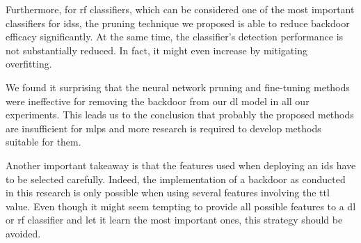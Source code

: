 \documentclass[10pt,sigconf,letterpaper,dvipsnames]{acmart}
\begin{document}
Furthermore, for \gls{rf} classifiers, which can be considered one of the most important classifiers for \glspl{ids}, the pruning technique we proposed is able to reduce backdoor efficacy significantly. At the same time, the classifier's detection performance is not substantially reduced. In fact, it might even increase by mitigating overfitting.

We found it surprising that the neural network pruning and fine-tuning methods were ineffective for removing the backdoor from our \gls{dl} model in all our experiments. This leads us to the conclusion that probably the proposed methods are insufficient for \glspl{mlp} and more research is required to develop methods suitable for them.

Another important takeaway is that the features used when deploying an \gls{ids} have to be selected carefully. Indeed, the implementation of a backdoor as conducted in this research is only possible when using several features involving the \gls{ttl} value. Even though it might seem tempting to provide all possible features to a \gls{dl} or \gls{rf} classifier and let it learn the most important ones, this strategy should be avoided.

%
%
%
\end{document}
